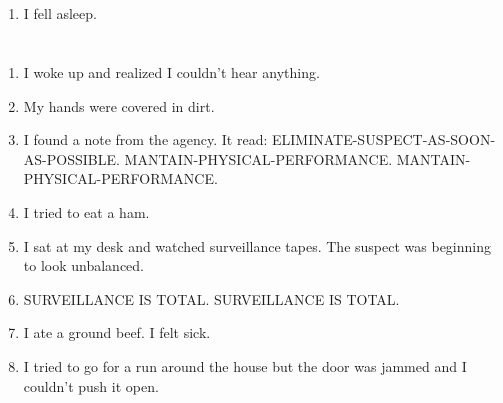 \documentclass{article}
\begin{document}
    \newpage
    
    \section{}
    
    \begin{enumerate}
    
    \item I fell asleep.\\
    
    \end{enumerate}
     
    \newpage
    
    \section{}
    
    \begin{enumerate}
    
    \item I woke up and realized I couldn't hear anything.\\
    
    \item My hands were covered in dirt.\\
    
    \item I found a note from the agency. It read: ELIMINATE-SUSPECT-AS-SOON-AS-POSSIBLE. MANTAIN-PHYSICAL-PERFORMANCE. MANTAIN-PHYSICAL-PERFORMANCE.\\
    
    \item I tried to eat a ham.\\
    
    \item I sat at my desk and watched surveillance tapes. The suspect was beginning to look unbalanced.\\
    
    \item SURVEILLANCE IS TOTAL. SURVEILLANCE IS TOTAL.\\
    
    \item I ate a ground beef. I felt sick.\\
    
    \item I tried to go for a run around the house but the door was jammed and I couldn't push it open.\\
    
    \end{enumerate}
     
\end{document}
